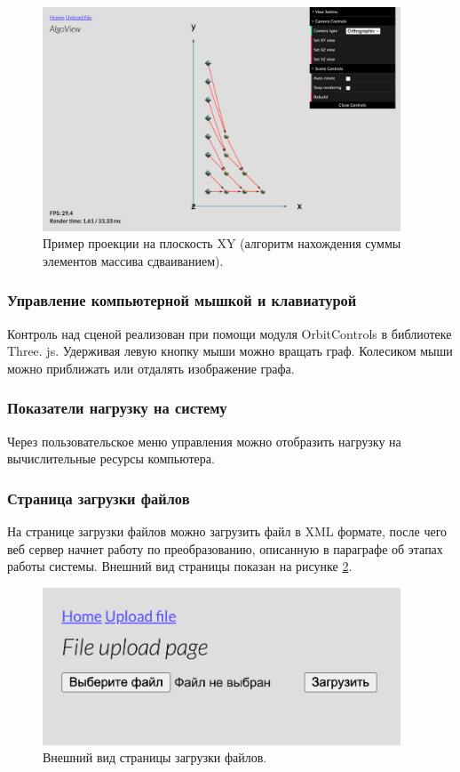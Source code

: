 \begin{figure}[!ht]
    \centering
    \includegraphics[width=0.95\textwidth]{assets/screenshot_2.png}
    \caption{Пример проекции на плоскость XY (алгоритм нахождения суммы элементов массива сдваиванием).}
    \label{fig:screenshot_2}
\end{figure}

\subsubsection{Управление компьютерной мышкой и клавиатурой}

Контроль над сценой реализован при помощи модуля OrbitControls в библиотеке Three. js. Удерживая левую кнопку мыши можно вращать граф. Колесиком мыши можно приближать или отдалять изображение графа. 

\subsubsection{Показатели нагрузку на систему}

Через пользовательское меню управления можно отобразить нагрузку на вычислительные ресурсы компьютера.

\subsubsection{Страница загрузки файлов}

На странице загрузки файлов  можно загрузить файл в XML формате, после чего веб сервер начнет работу по преобразованию, описанную в параграфе об этапах работы системы. Внешний вид страницы показан на рисунке \ref{fig:screenshot_3}.

\begin{figure}[!ht]
    \centering
    \includegraphics[width=0.95\textwidth]{assets/screenshot_3.png}
    \caption{Внешний вид страницы загрузки файлов.}
    \label{fig:screenshot_3}
\end{figure}
